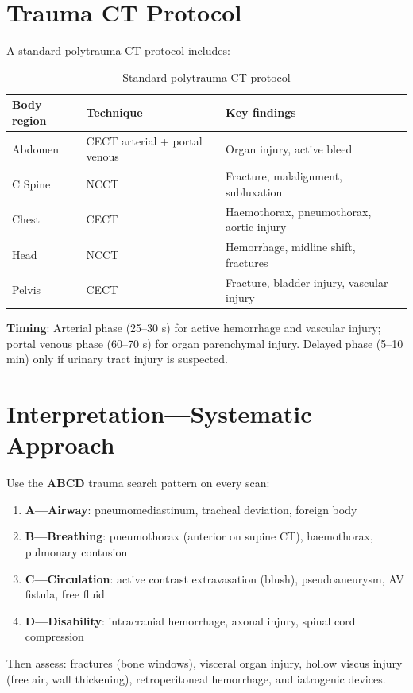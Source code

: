 \section{Trauma CT Protocol}
A standard polytrauma CT protocol includes:

\begin{table}[h]
\centering
\caption{Standard polytrauma CT protocol}
\begin{tabular}{|l|l|l|}
\hline
\textbf{Body region} & \textbf{Technique} & \textbf{Key findings} \\
\hline
Abdomen & CECT arterial + portal venous & Organ injury, active bleed \\
C Spine & NCCT & Fracture, malalignment, subluxation \\
Chest & CECT & Haemothorax, pneumothorax, aortic injury \\
Head & NCCT & Hemorrhage, midline shift, fractures \\
Pelvis & CECT & Fracture, bladder injury, vascular injury \\
\hline
\end{tabular}
\end{table}

\textbf{Timing}: Arterial phase (25--30 s) for active hemorrhage and vascular injury; portal venous phase (60--70 s) for organ parenchymal injury. Delayed phase (5--10 min) only if urinary tract injury is suspected.

\section{Interpretation---Systematic Approach}
Use the \textbf{ABCD} trauma search pattern on every scan:

\begin{enumerate}
  \item \textbf{A---Airway}: pneumomediastinum, tracheal deviation, foreign body
  \item \textbf{B---Breathing}: pneumothorax (anterior on supine CT), haemothorax, pulmonary contusion
  \item \textbf{C---Circulation}: active contrast extravasation (blush), pseudoaneurysm, AV fistula, free fluid
  \item \textbf{D---Disability}: intracranial hemorrhage, axonal injury, spinal cord compression
\end{enumerate}

Then assess: fractures (bone windows), visceral organ injury, hollow viscus injury (free air, wall thickening), retroperitoneal hemorrhage, and iatrogenic devices.

